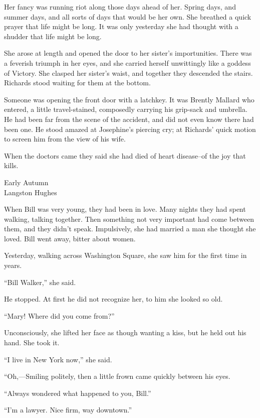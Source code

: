 \documentclass{article}        %
\begin{document}
Her fancy was running riot along those days ahead of her. Spring days, and summer days, and all sorts of days that would be her own. She breathed a quick prayer that life might be long. It was only yesterday she had thought with a shudder that life might be long.

She arose at length and opened the door to her sister's importunities. There was a feverish triumph in her eyes, and she carried herself unwittingly like a goddess of Victory. She clasped her sister's waist, and together they descended the stairs. Richards stood waiting for them at the bottom.

Someone was opening the front door with a latchkey. It was Brently Mallard who entered, a little travel-stained, composedly carrying his grip-sack and umbrella. He had been far from the scene of the accident, and did not even know there had been one. He stood amazed at Josephine's piercing cry; at Richards' quick motion to screen him from the view of his wife.

When the doctors came they said she had died of heart disease--of the joy that kills.

\newpage

\begin{center}
{\Large Early Autumn}\\
Langston Hughes
 \end{center}
 
 When Bill was very young, they had been in love. Many nights they had spent walking, talking together. Then something not very important had come between them, and they didn’t speak. Impulsively, she had married a man she thought she loved. Bill went away, bitter about women.
 
Yesterday, walking across Washington Square, she saw him for the first time in years.

“Bill Walker,” she said.

He stopped. At first he did not recognize her, to him she looked so old.

“Mary! Where did you come from?”

Unconsciously, she lifted her face as though wanting a kiss, but he held out his hand. She took it.

“I live in New York now,” she said.

“Oh,—Smiling politely, then a little frown came quickly between his eyes.

“Always wondered what happened to you, Bill.”

“I’m a lawyer. Nice firm, way downtown.”
\end{document}
